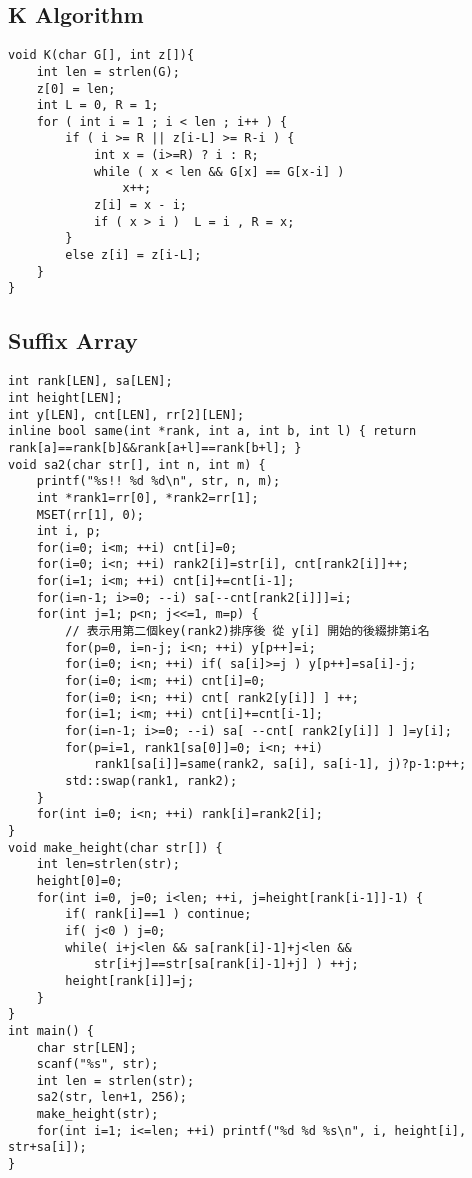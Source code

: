 \documentclass[11pt,twocolumn,a4paper]{article}
\begin{document}
\subsection{K Algorithm}
\begin{lstlisting}[label=K Algorithm]
void K(char G[], int z[]){
	int len = strlen(G);
	z[0] = len;
	int L = 0, R = 1;
	for ( int i = 1 ; i < len ; i++ ) {
		if ( i >= R || z[i-L] >= R-i ) {
			int x = (i>=R) ? i : R;
			while ( x < len && G[x] == G[x-i] )  
				x++;
			z[i] = x - i;
			if ( x > i )  L = i , R = x;	
		}		
		else z[i] = z[i-L];
	}
}
\end{lstlisting}

\newpage
\subsection{Suffix Array}
\begin{lstlisting}[label=Suffix Array]
int rank[LEN], sa[LEN];
int height[LEN];
int y[LEN], cnt[LEN], rr[2][LEN];
inline bool same(int *rank, int a, int b, int l) { return rank[a]==rank[b]&&rank[a+l]==rank[b+l]; }
void sa2(char str[], int n, int m) {
	printf("%s!! %d %d\n", str, n, m);
	int *rank1=rr[0], *rank2=rr[1];
	MSET(rr[1], 0);
	int i, p;
	for(i=0; i<m; ++i) cnt[i]=0;
	for(i=0; i<n; ++i) rank2[i]=str[i], cnt[rank2[i]]++;
	for(i=1; i<m; ++i) cnt[i]+=cnt[i-1];
	for(i=n-1; i>=0; --i) sa[--cnt[rank2[i]]]=i;
	for(int j=1; p<n; j<<=1, m=p) {
		// 表示用第二個key(rank2)排序後 從 y[i] 開始的後綴排第i名
		for(p=0, i=n-j; i<n; ++i) y[p++]=i;
		for(i=0; i<n; ++i) if( sa[i]>=j ) y[p++]=sa[i]-j;
		for(i=0; i<m; ++i) cnt[i]=0;
		for(i=0; i<n; ++i) cnt[ rank2[y[i]] ] ++;
		for(i=1; i<m; ++i) cnt[i]+=cnt[i-1];
		for(i=n-1; i>=0; --i) sa[ --cnt[ rank2[y[i]] ] ]=y[i];
		for(p=i=1, rank1[sa[0]]=0; i<n; ++i)
			rank1[sa[i]]=same(rank2, sa[i], sa[i-1], j)?p-1:p++;
		std::swap(rank1, rank2);
	}
	for(int i=0; i<n; ++i) rank[i]=rank2[i];
}
void make_height(char str[]) {
	int len=strlen(str);
	height[0]=0;
	for(int i=0, j=0; i<len; ++i, j=height[rank[i-1]]-1) {
		if( rank[i]==1 ) continue;
		if( j<0 ) j=0;
		while( i+j<len && sa[rank[i]-1]+j<len &&
			str[i+j]==str[sa[rank[i]-1]+j] ) ++j;
		height[rank[i]]=j;
	}
}
int main() {
	char str[LEN];
	scanf("%s", str);
	int len = strlen(str);
	sa2(str, len+1, 256);
	make_height(str);
	for(int i=1; i<=len; ++i) printf("%d %d %s\n", i, height[i], str+sa[i]);
}
\end{lstlisting}

\newpage
\end{document}
